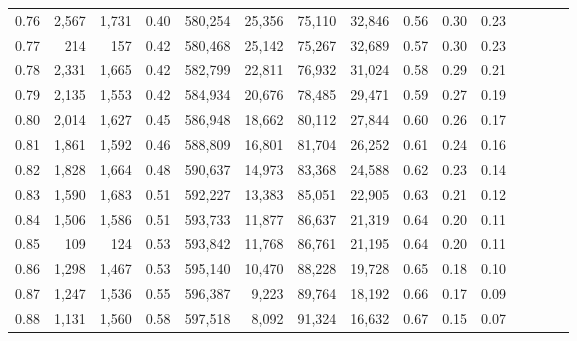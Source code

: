 \begin{tabular}{rrrcrrrrrrrrrrr}
0.76 &   2,567 &  1,731 &                                       0.40 &  580,254 &   25,356 &   75,110 &   32,846 &  0.56 &  0.30 &                         0.23 \\
0.77 &     214 &    157 &                                       0.42 &  580,468 &   25,142 &   75,267 &   32,689 &  0.57 &  0.30 &                         0.23 \\
0.78 &   2,331 &  1,665 &                                       0.42 &  582,799 &   22,811 &   76,932 &   31,024 &  0.58 &  0.29 &                         0.21 \\
0.79 &   2,135 &  1,553 &                                       0.42 &  584,934 &   20,676 &   78,485 &   29,471 &  0.59 &  0.27 &                         0.19 \\
0.80 &   2,014 &  1,627 &                                       0.45 &  586,948 &   18,662 &   80,112 &   27,844 &  0.60 &  0.26 &                         0.17 \\
0.81 &   1,861 &  1,592 &                                       0.46 &  588,809 &   16,801 &   81,704 &   26,252 &  0.61 &  0.24 &                         0.16 \\
0.82 &   1,828 &  1,664 &                                       0.48 &  590,637 &   14,973 &   83,368 &   24,588 &  0.62 &  0.23 &                         0.14 \\
0.83 &   1,590 &  1,683 &                                       0.51 &  592,227 &   13,383 &   85,051 &   22,905 &  0.63 &  0.21 &                         0.12 \\
0.84 &   1,506 &  1,586 &                                       0.51 &  593,733 &   11,877 &   86,637 &   21,319 &  0.64 &  0.20 &                         0.11 \\
0.85 &     109 &    124 &                                       0.53 &  593,842 &   11,768 &   86,761 &   21,195 &  0.64 &  0.20 &                         0.11 \\
0.86 &   1,298 &  1,467 &                                       0.53 &  595,140 &   10,470 &   88,228 &   19,728 &  0.65 &  0.18 &                         0.10 \\
0.87 &   1,247 &  1,536 &                                       0.55 &  596,387 &    9,223 &   89,764 &   18,192 &  0.66 &  0.17 &                         0.09 \\
0.88 &   1,131 &  1,560 &                                       0.58 &  597,518 &    8,092 &   91,324 &   16,632 &  0.67 &  0.15 &                         0.07 \\

\end{tabular}
